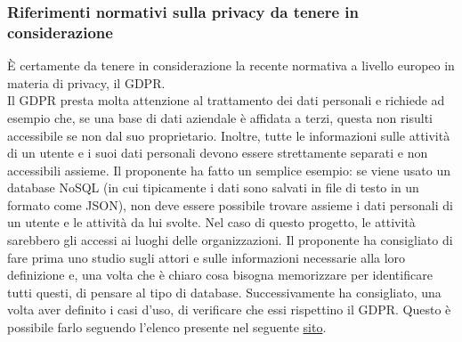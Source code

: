 \subsubsection*{Riferimenti normativi sulla privacy da tenere in considerazione}
È certamente da tenere in considerazione la recente normativa a livello europeo in materia di privacy, il GDPR. \\
Il GDPR presta molta attenzione al trattamento dei dati personali e richiede ad esempio che, se una base di dati aziendale è affidata a terzi, questa non risulti accessibile se non dal suo proprietario.
Inoltre, tutte le informazioni sulle attività di un utente e i suoi dati personali devono essere strettamente separati e non accessibili assieme. Il proponente ha fatto un semplice esempio: se viene usato un database
NoSQL (in cui tipicamente i dati sono salvati in file di testo in un formato come JSON), non deve essere possibile trovare assieme i dati personali di un utente e le attività da lui svolte. Nel caso di questo progetto, le attività sarebbero gli accessi ai luoghi delle organizzazioni.
Il proponente ha consigliato di fare prima uno studio sugli attori e sulle informazioni necessarie alla loro definizione e, una volta che è chiaro cosa bisogna memorizzare per identificare tutti questi, di pensare al tipo di database.
Successivamente ha consigliato, una volta aver definito i casi d'uso, di verificare che essi rispettino il GDPR. Questo è possibile farlo seguendo l'elenco presente nel seguente \href{https://gdpr.eu/checklist/}{sito}.

